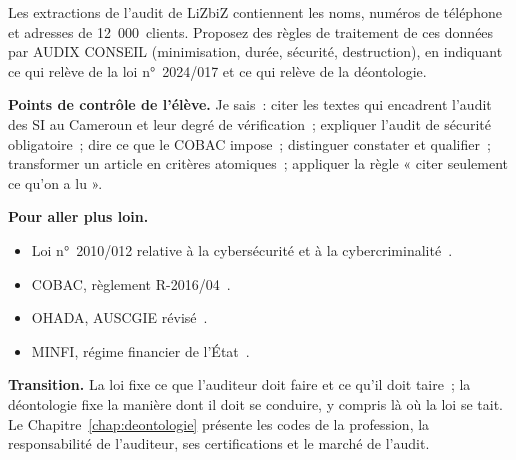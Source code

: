 \begin{boxexo}[title={\ding{45}\quad Exercice~15.10. Données personnelles et papiers de travail \niveauexpert}]
Les extractions de l'audit de LiZbiZ contiennent les noms, numéros de
téléphone et adresses de 12~000~clients. Proposez des règles de traitement
de ces données par AUDIX CONSEIL (minimisation, durée, sécurité,
destruction), en indiquant ce qui relève de la loi n°~2024/017 et ce qui
relève de la déontologie.
\end{boxexo}

\bigskip

\begin{boxinfo}
\textbf{Points de contrôle de l'élève.} Je sais~: citer les textes qui
encadrent l'audit des SI au Cameroun et leur degré de vérification~;
expliquer l'audit de sécurité obligatoire~; dire ce que le COBAC impose~;
distinguer constater et qualifier~; transformer un article en critères
atomiques~; appliquer la règle « citer seulement ce qu'on a lu ».
\end{boxinfo}

\begin{boxinfo}
\textbf{Pour aller plus loin.}
\begin{itemize}
    \item Loi n°~2010/012 relative à la cybersécurité et à la
          cybercriminalité~\cite{loi2010012}.
    \item COBAC, règlement R-2016/04~\cite{cobac2016r04}.
    \item OHADA, AUSCGIE révisé~\cite{ohada2014auscgie}.
    \item MINFI, régime financier de l'État~\cite{minfi2023regimefinancier}.
\end{itemize}
\end{boxinfo}

\begin{boxinfo}
\textbf{Transition.} La loi fixe ce que l'auditeur doit faire et ce qu'il
doit taire~; la déontologie fixe la manière dont il doit se conduire, y
compris là où la loi se tait. Le Chapitre~\ref{chap:deontologie} présente
les codes de la profession, la responsabilité de l'auditeur, ses
certifications et le marché de l'audit.
\end{boxinfo}
